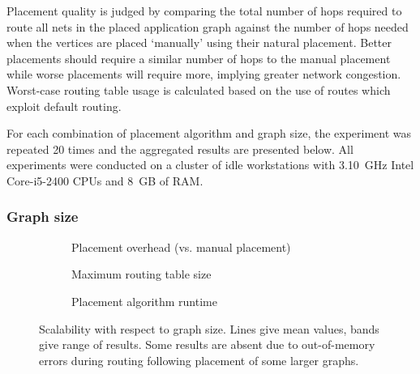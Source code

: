 			Placement quality is judged by comparing the total number of hops
			required to route all nets in the placed application graph against the
			number of hops needed when the vertices are placed `manually' using their
			natural placement. Better placements should require a similar number of
			hops to the manual placement while worse placements will require more,
			implying greater network congestion. Worst-case routing table usage is
			calculated based on the use of routes which exploit default routing.
			
			For each combination of placement algorithm and graph size, the
			experiment was repeated 20 times and the aggregated results are presented
			below. All experiments were conducted on a cluster of idle workstations
			with 3.10~GHz Intel Core-i5-2400 CPUs and 8~GB of RAM.
			
			\subsubsection{Graph size}
				
				\begin{figure}
					\center
					\begin{subfigure}{\linewidth}
						\center
						
						\caption{Placement overhead (vs. manual placement)}
						\label{fig:placement-scalability-size-quality}
					\end{subfigure}
					
					\vspace*{1em}
					
					\begin{subfigure}{\linewidth}
						\center
						
						\caption{Maximum routing table size}
						\label{fig:placement-scalability-size-entries}
					\end{subfigure}
					
					\vspace*{1em}
					
					\begin{subfigure}{\linewidth}
						\center
						
						\caption{Placement algorithm runtime}
						\label{fig:placement-scalability-size-runtime}
					\end{subfigure}
					
					\caption{Scalability with respect to graph size. Lines give mean
					values, bands give range of results. Some results are absent due to
					out-of-memory errors during routing following placement of some
					larger graphs.}
					\label{fig:placement-scalability-size}
				\end{figure}
				
